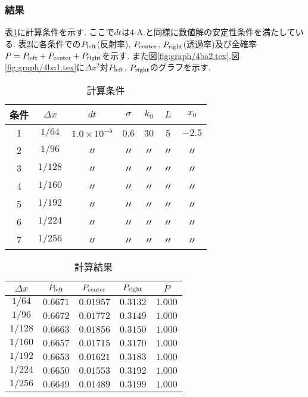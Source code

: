 \subsubsection*{結果}
表\ref{tab:4ad_cond}に計算条件を示す.
ここで$dt$は4-A.と同様に数値解の安定性条件を満たしている.
表\ref{tab:4ad_res}に各条件での$P_{\rm left}$(反射率), $P_{\rm center}$, $P_{\rm right}$(透過率)及び全確率$P=P_{\rm left}+P_{\rm center}+P_{\rm right}$を示す.
また図\ref{fig:graph/4ba2.tex},図\ref{fig:graph/4ba1.tex}に$\Delta x^2$対$P_{\rm left}$, $P_{\rm right}$のグラフを示す.
\begin{table}[h]
  \caption{計算条件}
  \label{tab:4ad_cond}
  \centering
  \begin{tabular}{ccccccc}
  \hline
  条件&$\Delta x$&$dt$&$\sigma$&$k_0$&$L$&$x_0$\\
  \hline \hline
  1&$1/64 $&$1.0\times 10^{-5}$&0.6&30&5&$-2.5$\\
  2&$1/96$&〃&〃&〃&〃&〃\\
  3&$1/128$&〃&〃&〃&〃&〃\\
  4&$1/160$&〃&〃&〃&〃&〃\\
  5&$1/192$&〃&〃&〃&〃&〃\\
  6&$1/224$&〃&〃&〃&〃&〃\\
  7&$1/256$&〃&〃&〃&〃&〃\\
  \hline
  \end{tabular}
\end{table}
\begin{table}[h]
  \caption{計算結果}
  \label{tab:4ad_res}
  \centering
  \begin{tabular}{ccccc}
  \hline
  $\Delta x$&$P_{\rm left}$&$P_{\rm center}$&$P_{\rm right}$&$P$\\
  \hline \hline
  $1/64 $&$0.6671$&$0.01957$&$0.3132$&$1.000$\\
  $1/96 $&$0.6672$&$0.01772$&$0.3149$&$1.000$\\
  $1/128$&$0.6663$&$0.01856$&$0.3150$&$1.000$\\
  $1/160$&$0.6657$&$0.01715$&$0.3170$&$1.000$\\
  $1/192$&$0.6653$&$0.01621$&$0.3183$&$1.000$\\
  $1/224$&$0.6650$&$0.01553$&$0.3192$&$1.000$\\
  $1/256$&$0.6649$&$0.01489$&$0.3199$&$1.000$\\
  \hline
  \end{tabular}
\end{table}
